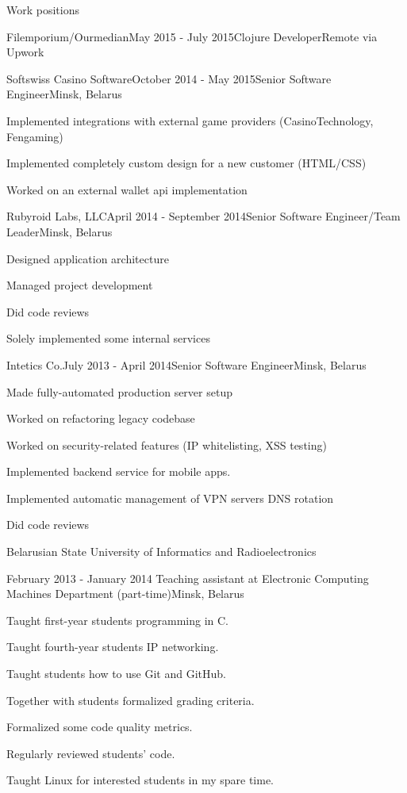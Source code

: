 \documentclass{resume} %
\begin{document}
\begin{rSection}{Work positions}
\begin{rSubsection}{Filemporium/Ourmedian}{May 2015 - July 2015}{Clojure Developer}{Remote via Upwork}
\end{rSubsection}

\begin{rSubsection}{Softswiss Casino Software}{October 2014 - May 2015}{Senior Software Engineer}{Minsk, Belarus}
\item Implemented integrations with external game providers (CasinoTechnology, Fengaming)
\item Implemented completely custom design for a new customer (HTML/CSS)
\item Worked on an external wallet api implementation
\end{rSubsection}

\begin{rSubsection}{Rubyroid Labs, LLC}{April 2014 - September 2014}{Senior Software Engineer/Team Leader}{Minsk, Belarus}
\item Designed application architecture
\item Managed project development
\item Did code reviews
\item Solely implemented some internal services
\end{rSubsection}

\begin{rSubsection}{Intetics Co.}{July 2013 - April 2014}{Senior Software Engineer}{Minsk, Belarus}
\item Made fully-automated production server setup
\item Worked on refactoring legacy codebase
\item Worked on security-related features (IP whitelisting, XSS testing)
\item Implemented backend service for mobile apps.
\item Implemented automatic management of VPN servers DNS rotation
\item Did code reviews
\end{rSubsection}

\begin{rSubsection}{\parbox[t][2em][t]{9cm}{Belarusian State University of Informatics and Radioelectronics}}{February 2013 - January 2014 }{Teaching assistant at Electronic Computing Machines Department (part-time)}{Minsk, Belarus}
\item Taught first-year students programming in C.
\item Taught fourth-year students IP networking.
\item Taught students how to use Git and GitHub.
\item Together with students formalized grading criteria.
\item Formalized some code quality metrics.
\item Regularly reviewed students' code.
\item Taught Linux for interested students in my spare time.
\end{rSubsection}


\end{rSection}
\end{document}
